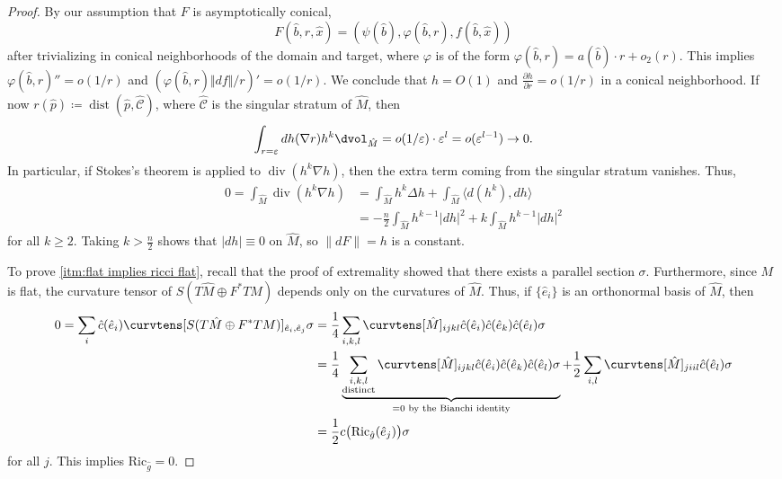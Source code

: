 \documentclass[12pt, reqno]{amsart}
\theoremstyle{plain} %
\theoremstyle{definition}
\theoremstyle{remark}
\numberwithin{equation}{section}
\newcommand{\dom}[1]{\hat{#1}}
\newcommand{\norm}[1]{\lVert #1 \rVert}
\newcommand{\onorm}[1]{\Vert #1 \Vert}
\newcommand{\pnorm}[1]{| #1 |}
\newcommand{\cat}[1]{\mathcal{#1}}
\newcommand{\Ric}{\mathrm{Ric}}
\newcommand{\inner}[1]{\langle #1 \rangle}
\newcommand{\ldim}{l} %
\DeclareMathOperator{\dist}{dist}
\DeclareMathOperator{\dive}{div}
\begin{document}
\begin{proof}
    By our assumption that \(F\) is asymptotically conical,
    \begin{equation*}
        F(\dom{b},r,\dom{x}) = (\psi(\dom{b}),\varphi(\dom{b},r),f(\dom{b},\dom{x}))
    \end{equation*}
    after trivializing in conical neighborhoods of the domain and target, where \(\varphi\) is of the form \(\varphi(\dom{b},r) = a(\dom{b}) \cdot r + o_2(r)\).
    This implies \(\varphi(\dom{b},r)'' = o(1/r)\) and \((\varphi(\dom{b},r) \onorm{df}/r)' = o(1/r)\).
    We conclude that \(h = O(1)\) and \(\frac{\partial h}{\partial r} = o(1/r)\) in a conical neighborhood.
    If now \(r(\dom{p}) \coloneqq \dist(\dom{p},\dom{\cat{C}})\), where \(\dom{\cat{C}}\) is the singular stratum of \(\dom{M}\), then
    \begin{equation*}\int_{r=\varepsilon} dh(\nabla r) h^k \dvol_{\dom{M}}=o(1/\varepsilon)\cdot \varepsilon^\ldim=o(\varepsilon^{\ldim-1})\to 0.\end{equation*}
    In particular, if Stokes's theorem is applied to \(\dive (h^k \nabla h)\), then the extra term coming from the singular stratum vanishes.
    Thus,
    \begin{align*}
        0 = \int_{\dom{M}} \dive (h^k \nabla h) &= \int_{\dom{M}} h^k \Delta h + \int_{\dom{M}} \inner{d(h^k), dh} \\
        &= -\frac{n}{2}\int_{\dom{M}} h^{k-1}\pnorm{dh}^2 + k\int_{\dom{M}} h^{k-1}\pnorm{dh}^2
    \end{align*}
    for all \(k \geq 2\).
    Taking \(k > \frac{n}{2}\) shows that \(\pnorm{dh} \equiv 0\) on \(\dom{M}\), so \(\norm{dF} = h\) is a constant.

    To prove \ref{itm:flat implies ricci flat}, recall that the proof of extremality showed that there exists a parallel section \(\sigma\).
    Furthermore, since \(M\) is flat, the curvature tensor of \(S(T\dom{M} \oplus F^*TM)\) depends only on the curvatures of \(\dom{M}\).
    Thus, if \(\{\dom{e}_i\}\) is an orthonormal basis of \(\dom{M}\), then
    \begin{align*}
        0 = \sum_{i} \dom{c}(\dom{e}_i) \curvtens[S(T\dom{M} \oplus F^*TM)]_{\dom{e}_i, \dom{e}_j} \sigma &= \frac{1}{4}\sum_{i,k,l} \curvtens[\dom{M}]_{ijkl} \dom{c}(\dom{e}_i)\dom{c}(\dom{e}_k)\dom{c}(\dom{e}_l) \sigma \\
        &= \frac{1}{4}\underbrace{\sum_{\substack{i,k,l \\ \text{distinct}}} \curvtens[\dom{M}]_{ijkl} \dom{c}(\dom{e}_i)\dom{c}(\dom{e}_k)\dom{c}(\dom{e}_l) \sigma}_{=0 \text{ by the Bianchi identity}} + \frac{1}{2} \sum_{i,l} \curvtens[\dom{M}]_{jiil} \dom{c}(\dom{e}_l) \sigma\\
        &= \frac{1}{2} c\big(\Ric_{\dom{g}}(\dom{e}_j)\big)\sigma
    \end{align*}
    for all \(j\).
    This implies \(\Ric_{\dom{g}} = 0\).
\end{proof}
\end{document}
